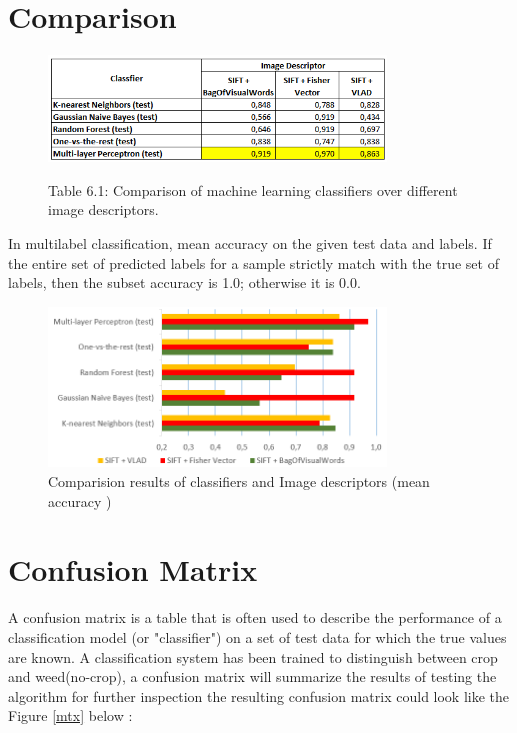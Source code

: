 \documentclass[12pt]{article}
\numberwithin{equation}{section}
\numberwithin{table}{section}
\numberwithin{figure}{section}
\begin{document}
\section{Comparison} \label{Comparison}


\begin{figure}[H] \centering
	\caption*{Table 6.1:  Comparison of machine learning classifiers over different image descriptors. }
	\includegraphics[width=0.8\textwidth]{class.png}
	\label{class}
\end{figure}

\noindent
In multilabel classification, mean accuracy on the given test data and labels.  If the entire set of predicted labels for a sample strictly match with the true set of labels, then the subset accuracy is 1.0; otherwise it is 0.0.

\begin{figure}[H] \centering
	\includegraphics[width=0.8\textwidth]{graph.png}
	\caption{Comparision results of classifiers and Image descriptors (mean accuracy )  }
	\label{graph}
\end{figure}

\section{Confusion Matrix} \label{cmatrix}

A confusion matrix is a table that is often used to describe the performance of a classification model (or "classifier") on a set of test data for which the true values are known.  A classification system has been trained to distinguish between crop and weed(no-crop), a confusion matrix will summarize the results of testing the algorithm for further inspection the resulting confusion matrix could look like the Figure \ref{mtx} below :
\end{document}
